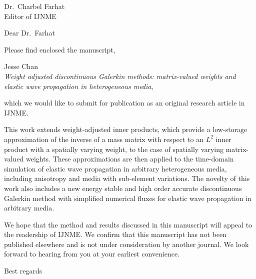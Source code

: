 \documentclass{letter}
\begin{document}
\begin{letter}{Dr.\ Charbel Farhat\\Editor of IJNME}

\opening{Dear Dr.\ Farhat}

Please find enclosed the manuscript, 
\begin{center}
Jesse Chan\\
\textit{Weight adjusted discontinuous Galerkin methods: matrix-valued weights and elastic wave propagation in heterogeneous media},
\end{center}
which we would like to submit for publication as an original research article in IJNME.  

This work extends weight-adjusted inner products, which provide a low-storage approximation of the inverse of a mass matrix with respect to an $L^2$ inner product with a spatially varying weight, to the case of spatially varying matrix-valued weights.  These approximations are then applied to the time-domain simulation of elastic wave propagation in arbitrary heterogeneous media, including anisotropy and media with sub-element variations.  The novelty of this work also includes a new energy stable and high order accurate discontinuous Galerkin method with simplified numerical fluxes for elastic wave propagation in arbitrary media.  

We hope that the method and results discussed in this manuscript will appeal to the readership of IJNME.  We confirm that this manuscript has not been published elsewhere and is not under consideration by another journal.  We look forward to hearing from you at your earliest convenience.  

\closing{Best regards}

\end{letter}
\end{document}

